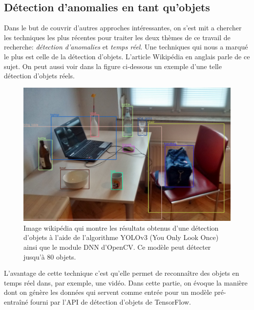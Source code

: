 \documentclass[french]{article}
\theoremstyle{mytheoremstyle}
\theoremstyle{mytheoremstyle}
\theoremstyle{myproblemstyle}
\begin{document}
        \subsection{Détection d'anomalies en tant qu'objets}
        Dans le but de couvrir d'autres approches intéressantes, on s'est mit a chercher les techniques les plus récentes pour traiter les deux thèmes de ce travail de recherche: \textit{détection d'anomalies} et \textit{temps réel}. Une techniques qui nous a marqué le plus est celle de la détection d'objets. L'article Wikipédia \cite{odwikipedia} en anglais parle de ce sujet. On peut aussi voir dans la figure ci-dessous un exemple d'une telle détection d'objets réels.
        \begin{figure}[H]
            \centering
            \includegraphics[width=.8\textwidth]{images/real_objects.jpg}
            \caption{Image wikipédia qui montre les résultats obtenus d'une détection d'objets à l'aide de l'algorithme YOLOv3 (You Only Look Once) ainsi que le module DNN d'OpenCV. Ce modèle peut détecter jusqu'à 80 objets.}
            \label{}
        \end{figure}
        L'avantage de cette technique c'est qu'elle permet de reconnaître des objets en temps réel dans, par exemple, une vidéo. Dans cette partie, on évoque la manière dont on génère les données qui servent comme entrée pour un modèle pré-entraîné fourni par l'API de détection d'objets de TensorFlow.
\end{document}
